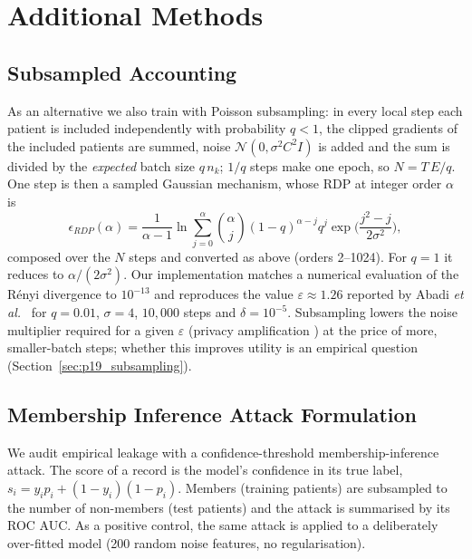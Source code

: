 \documentclass[journal]{IEEEtran}
\begin{document}
\section{Additional Methods}
\label{sec:methods_more}
\subsection{Subsampled Accounting}
As an alternative we also train with Poisson subsampling: in every local step each patient is included independently with probability $q<1$, the clipped gradients of the included patients are summed, noise $\mathcal{N}(0,\sigma^2C^2I)$ is added and the sum is divided by the \emph{expected} batch size $q\,n_k$; $1/q$ steps make one epoch, so $N = T\,E/q$. One step is then a sampled Gaussian mechanism, whose RDP at integer order $\alpha$ is \cite{Mironov2019SampledGaussian, Zhu2019Poisson, Wang2019SubsampledRDP}
\begin{equation}
\epsilon_{RDP}(\alpha) = \frac{1}{\alpha-1}\ln \sum_{j=0}^{\alpha} \binom{\alpha}{j} (1-q)^{\alpha-j} q^{j} \exp\!\Big(\frac{j^2-j}{2\sigma^2}\Big),
\end{equation}
composed over the $N$ steps and converted as above (orders 2--1024). For $q=1$ it reduces to $\alpha/(2\sigma^2)$. Our implementation matches a numerical evaluation of the Rényi divergence to $10^{-13}$ and reproduces the value $\varepsilon \approx 1.26$ reported by Abadi \emph{et al.}\ \cite{Abadi2016DPSGD} for $q=0.01$, $\sigma=4$, $10{,}000$ steps and $\delta=10^{-5}$. Subsampling lowers the noise multiplier required for a given $\varepsilon$ (privacy amplification \cite{Balle2018Amplification}) at the price of more, smaller-batch steps; whether this improves utility is an empirical question (Section~\ref{sec:p19_subsampling}).

\subsection{Membership Inference Attack Formulation}
We audit empirical leakage with a confidence-threshold membership-inference attack. The score of a record is the model's confidence in its true label, $s_i = y_i p_i + (1 - y_i)(1 - p_i)$. Members (training patients) are subsampled to the number of non-members (test patients) and the attack is summarised by its ROC AUC. As a positive control, the same attack is applied to a deliberately over-fitted model (200 random noise features, no regularisation).


\end{document}
